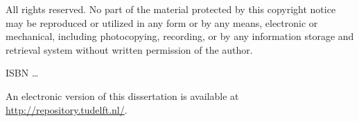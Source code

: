 \begin{titlepage}
\medskip
\medskip
\noindent All rights reserved. No part of the material protected by this copyright notice may be reproduced or utilized in any form or by any means, electronic or mechanical, including photocopying, recording, or by any information storage and retrieval system without written permission of the author.

\vspace{\bigskipamount}



\noindent ISBN \ldots

\medskip
\noindent An electronic version of this dissertation is available at \\
\url{http://repository.tudelft.nl/}.

\end{titlepage}

